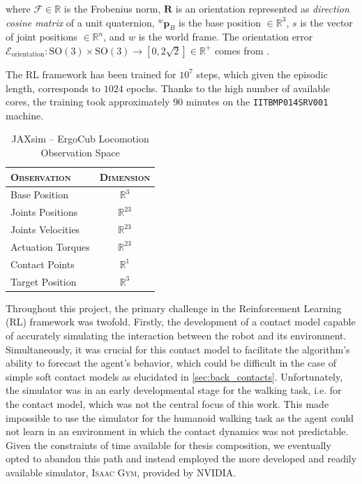 where $\mathcal{F} \in \mathbb{R}$ is the Frobenius norm, $\mathbf{R}$ is an orientation represented as \textit{direction cosine matrix} of a unit quaternion, ${}^w \mathbf{p}_B$ is the base position $\in \mathbb{R} ^3$, $s$ is the vector of joint positions $\in \mathbb{R} ^{n}$, and $w$ is the world frame.
The orientation error $\mathcal{E} _{\text{orientation}} : \mathrm{SO}(3) \times \mathrm{SO}(3) \rightarrow [0, 2\sqrt{2}] \in \mathbb{R} ^+$ comes from \citep{huynh_metrics_2009}.

The \ac{RL} framework has been trained for $10^7$ steps, which given the episodic length, corresponds to $1024$ epochs. Thanks to the high number of available cores, the training took approximately $90$ minutes on the \texttt{IITBMP014SRV001} machine.

\begin{table}
    \centering
    \label{tab:walkingobs_jaxsim}
    \begin{tabular}{l c}
        \toprule
        \textsc{Observation} & \textsc{Dimension} \\
        \midrule
        Base Position        & $\mathbb{R} ^{3}$  \\
        Joints Positions     & $\mathbb{R} ^{23}$ \\
        Joints Velocities    & $\mathbb{R} ^{23}$ \\
        Actuation Torques    & $\mathbb{R} ^{23}$ \\
        Contact Points       & $\mathbb{R} ^{1}$  \\
        Target Position      & $\mathbb{R} ^{3}$  \\
        \bottomrule
    \end{tabular}
    \caption{JAXsim -- ErgoCub Locomotion Observation Space}
\end{table}

Throughout this project, the primary challenge in the Reinforcement Learning (\ac{RL}) framework was twofold. Firstly, the development of a contact model capable of accurately simulating the interaction between the robot and its environment. Simultaneously, it was crucial for this contact model to facilitate the algorithm's ability to forecast the agent's behavior, which could be difficult in the case of simple soft contact models as elucidated in \cref{sec:back_contacts}. Unfortunately, the \jaxsim simulator was in an early developmental stage for the walking task, i.e. for the contact model, which was not the central focus of this work. This made impossible to use the \jaxsim simulator for the humanoid walking task as the agent could not learn in an environment in which the contact dynamics was not predictable. Given the constraints of time available for thesis composition, we eventually opted to abandon this path and instead employed the more developed and readily available simulator, \textsc{Isaac Gym}, provided by NVIDIA.

